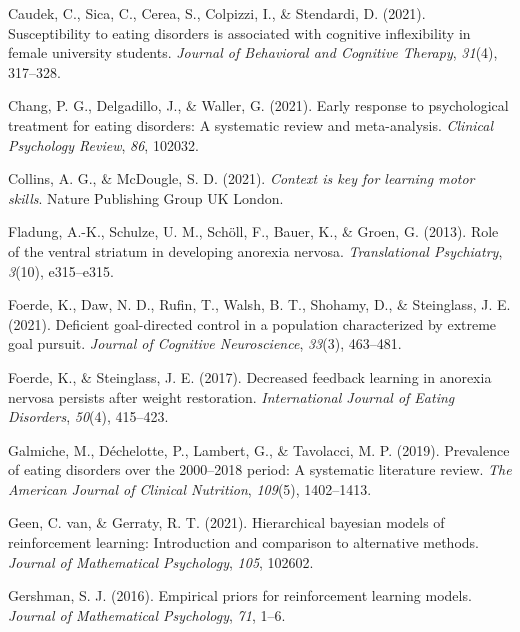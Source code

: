 \documentclass[
  man,floatsintext]{apa6}
\newlength{\cslhangindent}
\newlength{\cslentryspacingunit} %
\newenvironment{CSLReferences}[2] %
 {%
  \setlength{\parindent}{0pt}
  \ifodd #1
  \let\oldpar\par
  \def\par{\hangindent=\cslhangindent\oldpar}
  \fi
  \setlength{\parskip}{#2\cslentryspacingunit}
 }%
 {}
\begin{document}
\begin{CSLReferences}{1}{0}
\leavevmode{}%
Caudek, C., Sica, C., Cerea, S., Colpizzi, I., \& Stendardi, D. (2021). Susceptibility to eating disorders is associated with cognitive inflexibility in female university students. \emph{Journal of Behavioral and Cognitive Therapy}, \emph{31}(4), 317--328.

\leavevmode{}%
Chang, P. G., Delgadillo, J., \& Waller, G. (2021). Early response to psychological treatment for eating disorders: A systematic review and meta-analysis. \emph{Clinical Psychology Review}, \emph{86}, 102032.

\leavevmode{}%
Collins, A. G., \& McDougle, S. D. (2021). \emph{Context is key for learning motor skills}. Nature Publishing Group UK London.

\leavevmode{}%
Fladung, A.-K., Schulze, U. M., Schöll, F., Bauer, K., \& Groen, G. (2013). Role of the ventral striatum in developing anorexia nervosa. \emph{Translational Psychiatry}, \emph{3}(10), e315--e315.

\leavevmode{}%
Foerde, K., Daw, N. D., Rufin, T., Walsh, B. T., Shohamy, D., \& Steinglass, J. E. (2021). Deficient goal-directed control in a population characterized by extreme goal pursuit. \emph{Journal of Cognitive Neuroscience}, \emph{33}(3), 463--481.

\leavevmode{}%
Foerde, K., \& Steinglass, J. E. (2017). Decreased feedback learning in anorexia nervosa persists after weight restoration. \emph{International Journal of Eating Disorders}, \emph{50}(4), 415--423.

\leavevmode{}%
Galmiche, M., Déchelotte, P., Lambert, G., \& Tavolacci, M. P. (2019). Prevalence of eating disorders over the 2000--2018 period: A systematic literature review. \emph{The American Journal of Clinical Nutrition}, \emph{109}(5), 1402--1413.

\leavevmode{}%
Geen, C. van, \& Gerraty, R. T. (2021). Hierarchical bayesian models of reinforcement learning: Introduction and comparison to alternative methods. \emph{Journal of Mathematical Psychology}, \emph{105}, 102602.

\leavevmode{}%
Gershman, S. J. (2016). Empirical priors for reinforcement learning models. \emph{Journal of Mathematical Psychology}, \emph{71}, 1--6.


\end{CSLReferences}
\end{document}
